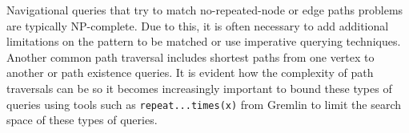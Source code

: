 Navigational queries that try to match no-repeated-node or edge paths problems are typically NP-complete. Due to this, it is often necessary to add additional limitations on the pattern to be matched or use imperative querying techniques. Another common path traversal includes shortest paths from one vertex to another or path existence queries. It is evident how the complexity of path traversals can be so it becomes increasingly important to bound these types of queries using tools such as \texttt{repeat...times(x)} from Gremlin to limit the search space of these types of queries.
